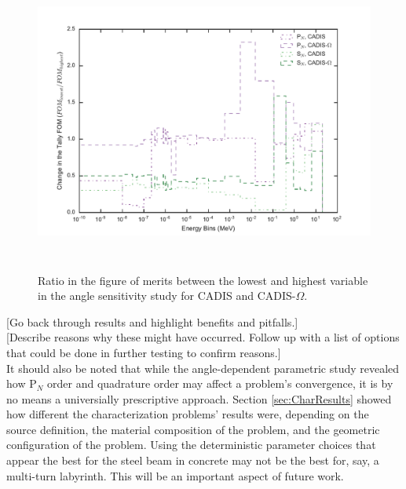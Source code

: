 \begin{figure}[h!]
  \centering
  \includegraphics[height=10cm]{./chapters/characterization_probs/figures/angle/prob_1/improvement_fom_allmethds.pdf}
  \caption[Ratio in the figure of merits between the lowest and highest variable in the angle
  sensitivity study for CADIS and CADIS-$\Omega$.]{Ratio in the figure of merits between
    the lowest and highest variable in the angle sensitivity study for CADIS and CADIS-$\Omega$.}
  \label{fig:angle_fom_improvements}
\end{figure}

[Go back through results and highlight benefits and pitfalls.] \\

[Describe reasons why these might have occurred. Follow up with a list of options
that could be done in further testing to confirm reasons.] \\

It should also be noted that while the angle-dependent parametric study revealed
how P$_N$ order and quadrature order may affect a problem's convergence, it is
by no means a universially prescriptive approach. Section \ref{sec:CharResults}
showed how different the characterization problems' results were, depending on
the source definition, the material composition of the problem, and the
geometric configuration of the problem. Using the deterministic parameter
choices that appear the best for the steel beam in concrete may not be the best
for, say, a multi-turn labyrinth. This will be an important aspect of future
work.
